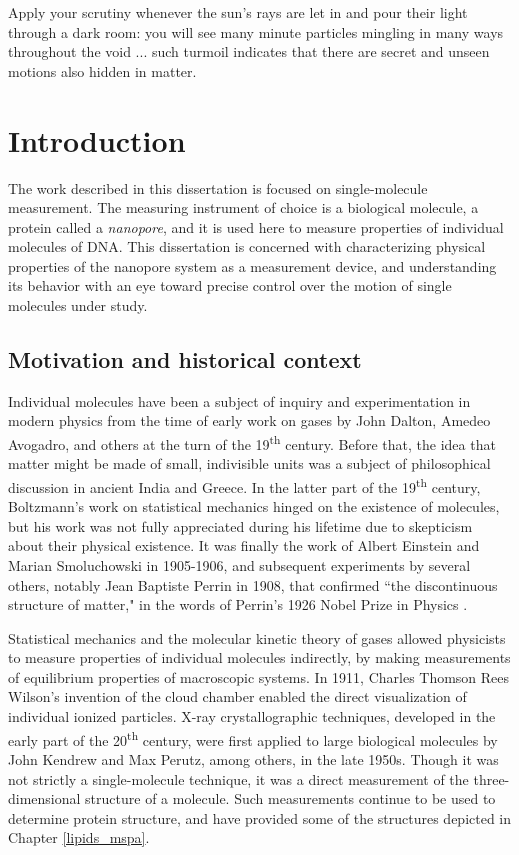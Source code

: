 \begin{savequote}[75mm]
Apply your scrutiny whenever the sun's rays are let in and pour their light through a dark room: you will see many minute particles mingling in many ways throughout the void ... such turmoil indicates that there are secret and unseen motions also hidden in matter.
\end{savequote}

\chapter{Introduction}
\label{introduction}

The work described in this dissertation is focused on single-molecule measurement.  The measuring instrument of choice is a biological molecule, a protein called a \textit{nanopore}, and it is used here to measure properties of individual molecules of DNA.  This dissertation is concerned with characterizing physical properties of the nanopore system as a measurement device, and understanding its behavior with an eye toward precise control over the motion of single molecules under study.

\section{Motivation and historical context}

Individual molecules have been a subject of inquiry and experimentation in modern physics from the time of early work on gases by John Dalton, Amedeo Avogadro, and others at the turn of the 19\textsuperscript{th} century.  Before that, the idea that matter might be made of small, indivisible units was a subject of philosophical discussion in ancient India and Greece.  In the latter part of the 19\textsuperscript{th} century, Boltzmann's work on statistical mechanics hinged on the existence of molecules, but his work was not fully appreciated during his lifetime due to skepticism about their physical existence.  It was finally the work of Albert Einstein and Marian Smoluchowski in 1905-1906, and subsequent experiments by several others, notably Jean Baptiste Perrin in 1908, that confirmed ``the discontinuous structure of matter," in the words of Perrin's 1926 Nobel Prize in Physics \citep{Nobel1926}.

Statistical mechanics and the molecular kinetic theory of gases allowed physicists to measure properties of individual molecules indirectly, by making measurements of equilibrium properties of macroscopic systems.  In 1911, Charles Thomson Rees Wilson's invention of the cloud chamber enabled the direct visualization of individual ionized particles.  X-ray crystallographic techniques, developed in the early part of the 20\textsuperscript{th} century, were first applied to large biological molecules by John Kendrew \citep{Kendrew1958} and Max Perutz, among others, in the late 1950s.  Though it was not strictly a single-molecule technique, it was a direct measurement of the three-dimensional structure of a molecule.  Such measurements continue to be used to determine protein structure, and have provided some of the structures depicted in Chapter \ref{lipids_mspa}.

